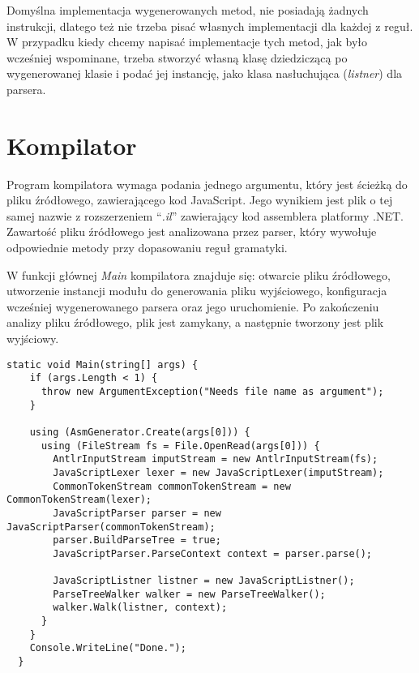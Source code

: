 \par Domyślna implementacja wygenerowanych metod, nie posiadają żadnych instrukcji, dlatego też nie trzeba pisać własnych implementacji dla każdej z reguł. W przypadku kiedy chcemy napisać implementacje tych metod, jak było wcześniej wspominane, trzeba stworzyć własną klasę dziedziczącą po wygenerowanej klasie i podać jej instancję, jako klasa nasłuchująca (\textit{listner}) dla parsera.

\section{Kompilator}

\par Program kompilatora wymaga podania jednego argumentu, który jest ścieżką do pliku źródłowego, zawierającego kod JavaScript. Jego wynikiem jest plik o tej samej nazwie z rozszerzeniem ``\textit{.il}'' zawierający kod assemblera platformy .NET. Zawartość pliku źródłowego jest analizowana przez parser, który wywołuje odpowiednie metody przy dopasowaniu reguł gramatyki.
\par W funkcji głównej \textit{Main} kompilatora znajduje się: otwarcie pliku źródłowego, utworzenie instancji modułu do generowania pliku wyjściowego, konfiguracja wcześniej wygenerowanego parsera oraz jego uruchomienie. Po zakończeniu analizy pliku źródłowego, plik jest zamykany, a następnie tworzony jest plik wyjściowy.

\begin{lstlisting}[language=CSharp, caption=Funkcja \textit{Main} kompilatora, label=alg:komMain]
  static void Main(string[] args) {
    if (args.Length < 1) {
      throw new ArgumentException("Needs file name as argument");
    }

    using (AsmGenerator.Create(args[0])) {
      using (FileStream fs = File.OpenRead(args[0])) {
        AntlrInputStream imputStream = new AntlrInputStream(fs);
        JavaScriptLexer lexer = new JavaScriptLexer(imputStream);
        CommonTokenStream commonTokenStream = new CommonTokenStream(lexer);
        JavaScriptParser parser = new JavaScriptParser(commonTokenStream);
        parser.BuildParseTree = true;
        JavaScriptParser.ParseContext context = parser.parse();

        JavaScriptListner listner = new JavaScriptListner();
        ParseTreeWalker walker = new ParseTreeWalker();
        walker.Walk(listner, context);
      }
    }
    Console.WriteLine("Done.");
  }
\end{lstlisting}

